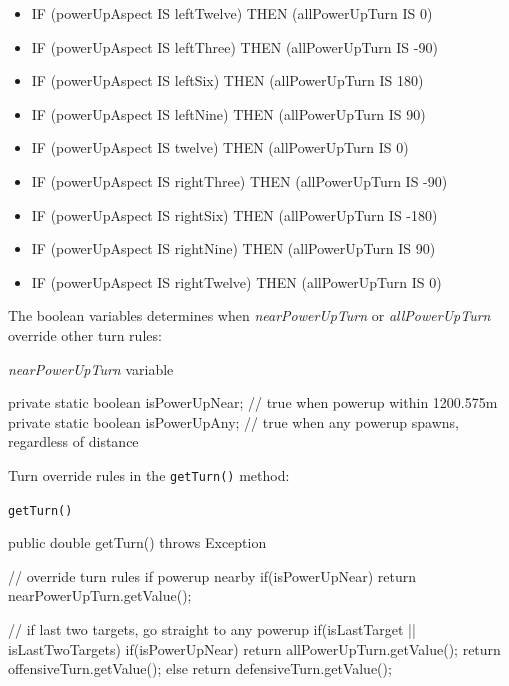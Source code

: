 \begin{itemize}
\item IF (powerUpAspect IS leftTwelve) THEN (allPowerUpTurn IS 0)
\item IF (powerUpAspect IS leftThree) THEN (allPowerUpTurn IS -90)
\item IF (powerUpAspect IS leftSix) THEN (allPowerUpTurn IS 180)
\item IF (powerUpAspect IS leftNine) THEN (allPowerUpTurn IS 90)
\item IF (powerUpAspect IS twelve) THEN (allPowerUpTurn IS 0)
\item IF (powerUpAspect IS rightThree) THEN (allPowerUpTurn IS -90)
\item IF (powerUpAspect IS rightSix) THEN (allPowerUpTurn IS -180)
\item IF (powerUpAspect IS rightNine) THEN (allPowerUpTurn IS 90)
\item IF (powerUpAspect IS rightTwelve) THEN (allPowerUpTurn IS 0)
\end{itemize}

\noindent
The boolean variables determines when \emph{nearPowerUpTurn} or \emph{allPowerUpTurn} override other turn rules:

\begin{listing}[H]
\caption{\emph{nearPowerUpTurn} variable}
\begin{javacode}
private static boolean isPowerUpNear; // true when powerup within 1200.575m
private static boolean isPowerUpAny; // true when any powerup spawns, regardless of distance
\end{javacode}
\end{listing}

\noindent
Turn override rules in the \texttt{getTurn()} method:

\begin{listing}[H]
\caption{\texttt{getTurn()}}
\begin{javacode}
public double getTurn() throws Exception {

    // override turn rules if powerup nearby
    if(isPowerUpNear) {
        return nearPowerUpTurn.getValue();
    }
	
    // if last two targets, go straight to any powerup
    if(isLastTarget || isLastTwoTargets) {
        if(isPowerUpNear) {
            return allPowerUpTurn.getValue();
        }
        return offensiveTurn.getValue();
    } else {
        return defensiveTurn.getValue();
    }
}
\end{javacode}
\end{listing}

